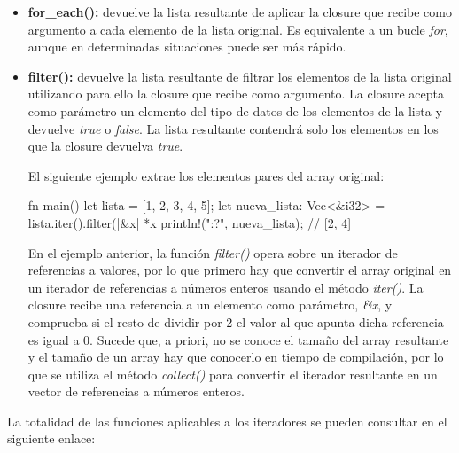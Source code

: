 \begin{itemize}
   \item \textbf{for\_each():} devuelve la lista resultante de aplicar la closure que recibe como argumento a cada elemento de la lista original. Es equivalente a un bucle \textit{for}, aunque en determinadas situaciones puede ser más rápido.
   
   \item \textbf{filter():} devuelve la lista resultante de filtrar los elementos de la lista original utilizando para ello la closure que recibe como argumento. La closure acepta como parámetro un elemento del tipo de datos de los elementos de la lista y devuelve \textit{true} o \textit{false}. La lista resultante contendrá solo los elementos en los que la closure devuelva \textit{true}.
   
   El siguiente ejemplo extrae los elementos pares del array original:
   \vspace{0.7em}
   \begin{Codigo}
      fn main() {
         let lista = [1, 2, 3, 4, 5];
         let nueva_lista: Vec<&i32> = lista.iter().filter(|&x| *x%
         println!("{:?}", nueva_lista); // [2, 4]
      }
   \end{Codigo}
   En el ejemplo anterior, la función \textit{filter()} opera sobre un iterador de referencias a valores, por lo que primero hay que convertir el array original en un iterador de referencias a números enteros usando el método \textit{iter()}. La closure recibe una referencia a un elemento como parámetro, \textit{\&x}, y comprueba si el resto de dividir por 2 el valor al que apunta dicha referencia es igual a 0. Sucede que, a priori, no se conoce el tamaño del array resultante y el tamaño de un array hay que conocerlo en tiempo de compilación, por lo que se utiliza el método \textit{collect()} para convertir el iterador resultante en un vector de referencias a números enteros.  
   
   
   
   \vspace{0.7em}
   \begin{Codigo}
      
   \end{Codigo}
\end{itemize}



La totalidad de las funciones aplicables a los iteradores se pueden consultar en el siguiente enlace:

{\centering \url{} \par}

